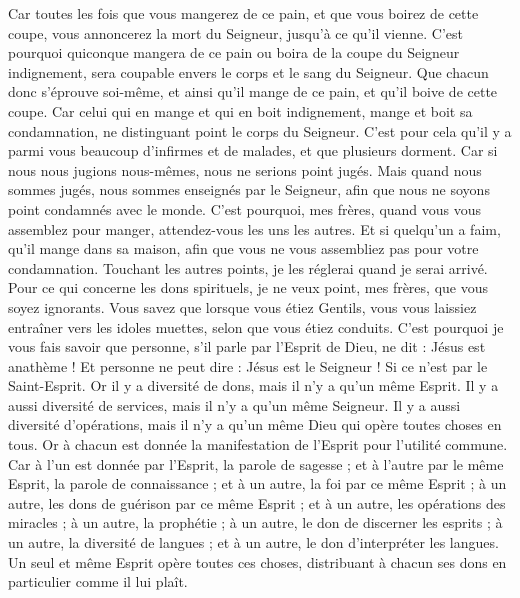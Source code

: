 \begin{multicols}{2}
Car toutes les fois que vous mangerez de ce pain, et que vous boirez de cette coupe, vous annoncerez la mort du Seigneur, jusqu'à ce qu'il vienne.
C'est pourquoi quiconque mangera de ce pain ou boira de la coupe du Seigneur indignement, sera coupable envers le corps et le sang du Seigneur.
Que chacun donc s'éprouve soi-même, et ainsi qu'il mange de ce pain, et qu'il boive de cette coupe.
 Car celui qui en mange et qui en boit indignement, mange et boit sa condamnation, ne distinguant point le corps du Seigneur.
C'est pour cela qu'il y a parmi vous beaucoup d'infirmes et de malades, et que plusieurs dorment.
Car si nous nous jugions nous-mêmes, nous ne serions point jugés.
Mais quand nous sommes jugés, nous sommes enseignés par le Seigneur, afin que nous ne soyons point condamnés avec le monde.
C'est pourquoi, mes frères, quand vous vous assemblez pour manger, attendez-vous les uns les autres.
Et si quelqu'un a faim, qu'il mange dans sa maison, afin que vous ne vous assembliez pas pour votre condamnation. Touchant les autres points, je les réglerai quand je serai arrivé.
\VerseOne{}Pour ce qui concerne les dons spirituels, je ne veux point, mes frères, que vous soyez ignorants.
Vous savez que lorsque vous étiez Gentils, vous vous laissiez entraîner vers les idoles muettes, selon que vous étiez conduits.
C'est pourquoi je vous fais savoir que personne, s'il parle par l'Esprit de Dieu, ne dit : Jésus est anathème ! Et personne ne peut dire : Jésus est le Seigneur ! Si ce n'est par le Saint-Esprit.
 Or il y a diversité de dons, mais il n'y a qu'un même Esprit.
Il y a aussi diversité de services, mais il n'y a qu'un même Seigneur.
Il y a aussi diversité d'opérations, mais il n'y a qu'un même Dieu qui opère toutes choses en tous.
Or à chacun est donnée la manifestation de l'Esprit pour l'utilité commune.
Car à l'un est donnée par l'Esprit, la parole de sagesse ; et à l'autre par le même Esprit, la parole de connaissance ;
et à un autre, la foi par ce même Esprit ; à un autre, les dons de guérison par ce même Esprit ;
et à un autre, les opérations des miracles ; à un autre, la prophétie ; à un autre, le don de discerner les esprits ; à un autre, la diversité de langues ; et à un autre, le don d'interpréter les langues.
Un seul et même Esprit opère toutes ces choses, distribuant à chacun ses dons en particulier comme il lui plaît.

\end{multicols}
